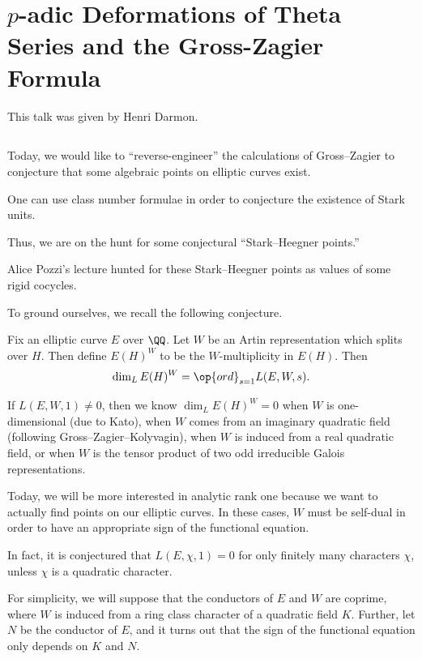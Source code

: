 \documentclass{article}
\begin{document}
\section{\texorpdfstring{$p$}{p}-adic Deformations of Theta Series and the Gross-Zagier Formula}
This talk was given by Henri Darmon.

\subsection{}
Today, we would like to ``reverse-engineer'' the calculations of Gross--Zagier to conjecture that some algebraic points on elliptic curves exist.
\begin{example}
	One can use class number formulae in order to conjecture the existence of Stark units.
\end{example}
Thus, we are on the hunt for some conjectural ``Stark--Heegner points.''
\begin{example}
	Alice Pozzi's lecture hunted for these Stark--Heegner points as values of some rigid cocycles.
\end{example}
To ground ourselves, we recall the following conjecture.
\begin{conj} \label{conj:equiv-bsd}
	Fix an elliptic curve $E$ over $\QQ$. Let $W$ be an Artin representation which splits over $H$. Then define $E(H)^W$ to be the $W$-multiplicity in $E(H)$. Then
	\[\dim_LE(H)^W=\op{ord}_{s=1}L(E,W,s).\]
\end{conj}
\begin{remark}
	If $L(E,W,1)\ne0$, then we know $\dim_LE(H)^W=0$ when $W$ is one-dimensional (due to Kato), when $W$ comes from an imaginary quadratic field (following Gross--Zagier--Kolyvagin), when $W$ is induced from a real quadratic field, or when $W$ is the tensor product of two odd irreducible Galois representations.
\end{remark}
Today, we will be more interested in analytic rank one because we want to actually find points on our elliptic curves. In these cases, $W$ must be self-dual in order to have an appropriate sign of the functional equation.
\begin{remark}
	In fact, it is conjectured that $L(E,\chi,1)=0$ for only finitely many characters $\chi$, unless $\chi$ is a quadratic character.
\end{remark}
For simplicity, we will suppose that the conductors of $E$ and $W$ are coprime, where $W$ is induced from a ring class character of a quadratic field $K$. Further, let $N$ be the conductor of $E$, and it turns out that the sign of the functional equation only depends on $K$ and $N$.
\end{document}
